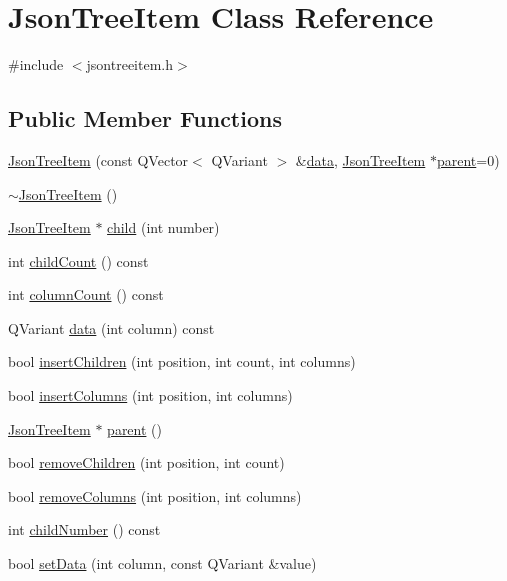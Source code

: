 \hypertarget{class_json_tree_item}{}\section{Json\+Tree\+Item Class Reference}
\label{class_json_tree_item}


{\ttfamily \#include $<$jsontreeitem.\+h$>$}

\subsection*{Public Member Functions}
\begin{DoxyCompactItemize}
\item 
\hyperlink{class_json_tree_item_a3a4ebfeec3401b43940cddc8dd644727}{Json\+Tree\+Item} (const Q\+Vector$<$ Q\+Variant $>$ \&\hyperlink{class_json_tree_item_a3cd46e11efb01a8c7f59d6bf3c4582d4}{data}, \hyperlink{class_json_tree_item}{Json\+Tree\+Item} $\ast$\hyperlink{class_json_tree_item_a1777c30033cacb28a800b34423dcee38}{parent}=0)
\item 
\hyperlink{class_json_tree_item_aac595e07ae4a51106c478e0d99a149e0}{$\sim$\+Json\+Tree\+Item} ()
\item 
\hyperlink{class_json_tree_item}{Json\+Tree\+Item} $\ast$ \hyperlink{class_json_tree_item_a24864c7936a43d9059277a20497341b9}{child} (int number)
\item 
int \hyperlink{class_json_tree_item_a24d3056cd6f6f2d442cbd0d9756b89c1}{child\+Count} () const
\item 
int \hyperlink{class_json_tree_item_ad66ee4ac09255aa32fb05ffbd4057413}{column\+Count} () const
\item 
Q\+Variant \hyperlink{class_json_tree_item_a3cd46e11efb01a8c7f59d6bf3c4582d4}{data} (int column) const
\item 
bool \hyperlink{class_json_tree_item_a890a0b7cf4aabcaa43e0726d672ba34a}{insert\+Children} (int position, int count, int columns)
\item 
bool \hyperlink{class_json_tree_item_a189b5b2926b94dc53f3aaa366cf66b05}{insert\+Columns} (int position, int columns)
\item 
\hyperlink{class_json_tree_item}{Json\+Tree\+Item} $\ast$ \hyperlink{class_json_tree_item_a1777c30033cacb28a800b34423dcee38}{parent} ()
\item 
bool \hyperlink{class_json_tree_item_a37ef4384835286e1afcc6f42de7b1c6a}{remove\+Children} (int position, int count)
\item 
bool \hyperlink{class_json_tree_item_a7cb315d624881ca9fbb193c5432a82b2}{remove\+Columns} (int position, int columns)
\item 
int \hyperlink{class_json_tree_item_a39c277f6a181ec177b483b38e97e70d5}{child\+Number} () const
\item 
bool \hyperlink{class_json_tree_item_a7b60096836271a128a142c023a769e12}{set\+Data} (int column, const Q\+Variant \&value)
\end{DoxyCompactItemize}


